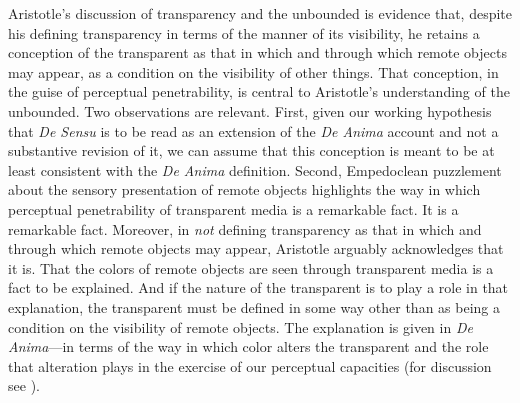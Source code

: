 \documentclass[12pt]{article}
\begin{document}
Aristotle's discussion of transparency and the unbounded is evidence that, despite his defining transparency in terms of the manner of its visibility, he retains a conception of the transparent as that in which and through which remote objects may appear, as a condition on the visibility of other things. That conception, in the guise of perceptual penetrability, is central to Aristotle's understanding of the unbounded. Two observations are relevant. First, given our working hypothesis that \emph{De Sensu} is to be read as an extension of the \emph{De Anima} account and not a substantive revision of it, we can assume that this conception is meant to be at least consistent with the \emph{De Anima} definition.  Second, Empedoclean puzzlement about the sensory presentation of remote objects highlights the way in which perceptual penetrability of transparent media is a remarkable fact. It is a remarkable fact. Moreover, in \emph{not} defining transparency as that in which and through which remote objects may appear, Aristotle arguably acknowledges that it is. That the colors of remote objects are seen through transparent media is a fact to be explained. And if the nature of the transparent is to play a role in that explanation, the transparent must be defined in some way other than as being a condition on the visibility of remote objects. The explanation is given in \emph{De Anima}---in terms of the way in which color alters the transparent and the role that alteration plays in the exercise of our perceptual capacities (for discussion see \citealt{Polansky:2007ly,Kalderon:2015fr}).



 
 
\end{document}
